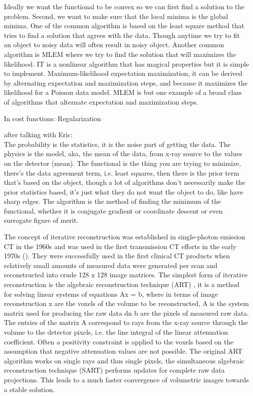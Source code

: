  Ideally we want the functional to be convex so we can first find a solution to the problem.  Second, we want to make sure that the local minima is the global minima.  One of the common algorithm is based on the least square method that tries to find a solution that agrees with the data.  Though anytime we try to fit an object to noisy data will often result in noisy object.  Another common algorithm is MLEM where we try to find the solution that will maximizes the likelihood.  IT is a nonlinear algorithm that has magical properties but it is simple to implement.
Maximum-likelihood expectation maximization, it can be derived by alternating expectation and maximization steps, and because it maximizes the likelihood for a Poisson data model.  MLEM is but one example of a broad class of algorithms that alternate expectation and maximization steps.  


In cost functions: 
Regularization


after talking with Eric: \\
The probability is the statistics, it is the noise part of getting the data.  The physics is the model, aka, the mean of the data, from x-ray source to the values on the detector (mean).  The functional is the thing you are trying to minimize, there's the data agreement term, i.e. least squares, then there is the prior term that's based on the object, though a lot of algorithms don't necessarily make the prior statistics based, it's just what they do not want the object to do, like have sharp edges.  The algorithm is the method of finding the minimum of the functional, whether it is conjugate gradient or coordinate descent or even surrogate figure of merit.



The concept of iterative reconstruction was established in single-photon emission CT in the 1960s and was used in the first transmission CT efforts in the early 1970s (\citep{Housfield1973}).  They were successfully used in the first clinical CT products when relatively small amounts of measured data were generated per scan and reconstructed into crude 128 x 128 image matrices.
The simplest form of iterative reconstruction is the algebraic reconstruction technique (ART) \citep{Gordon1970}, it is a method for solving linear systems of equations Ax = b, where in terms of image reconstruction x are the voxels of the volume to be reconstructed, A is the system matrix used for producing the raw data dn b are the pixels of measured raw data.  The entries of the matrix A correspond to rays from the x-ray source through the volume to the detector pixels, i.e. the line integral of the linear attenuation coefficient.  Often a positivity constraint is applied to the voxels based on the assumption that negative attenuation values are not possible.  The original ART algorithm works on single rays and thus single pixels, the simultaneous algebraic reconstruction technique (SART) performs updates for complete raw data projections.  This leads to a much faster convergence of volumetric images towards a stable solution. 

